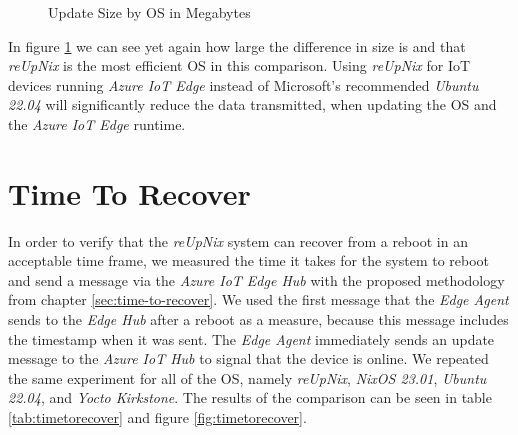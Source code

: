 \begin{figure}[htbp]
  \centering
\caption{Update Size by OS in Megabytes}
\label{fig:update-size}
\end{figure}

\noindent
In figure \ref{fig:update-size} we can see yet again how large the difference
in size is and that \textit{reUpNix} is the most efficient \ac{OS} in this comparison.
Using \textit{reUpNix} for \ac{IoT} devices running \textit{Azure IoT Edge}
instead of Microsoft's recommended \textit{Ubuntu 22.04} will significantly reduce
the data transmitted, when updating the \ac{OS} and the \textit{Azure IoT Edge} runtime.

\section{Time To Recover}
In order to verify that the \textit{reUpNix} system can recover from a reboot
in an acceptable time frame, we measured the time it takes for the system to
reboot and send a message via the \textit{Azure IoT Edge Hub} with the proposed
methodology from chapter \ref{sec:time-to-recover}. We used the first message
that the \textit{Edge Agent} sends to the \textit{Edge Hub} after a reboot as
a measure, because this message includes the timestamp when it was sent.
The \textit{Edge Agent} immediately sends an update message to the \textit{Azure
IoT Hub} to signal that the device is online. We repeated the same experiment
for all of the \ac{OS}, namely \textit{reUpNix}, \textit{NixOS 23.01},
\textit{Ubuntu 22.04}, and \textit{Yocto Kirkstone}. The results of the comparison
can be seen in table \ref{tab:timetorecover} and figure \ref{fig:timetorecover}.


